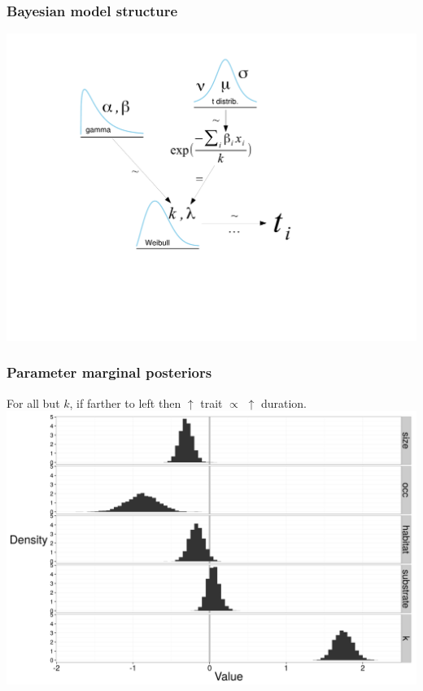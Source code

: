 \documentclass{beamer}
\begin{document}
\begin{frame}
  \frametitle{Bayesian model structure}
  \begin{center}
    \includegraphics[height = 0.8\textheight, width = \textwidth, keepaspectratio = true]{figure/surv_rev}
  \end{center}
\end{frame}


\begin{frame}
  \frametitle{Parameter marginal posteriors}
  \begin{center}
    For all but \(k\), if farther to \alert{left} then \(\uparrow\) trait \(\propto\) \(\uparrow\) duration.
    \includegraphics[height = 0.7\textheight, width = \textwidth, keepaspectratio = true]{figure/wei_post}
  \end{center}
\end{frame}
\end{document}
